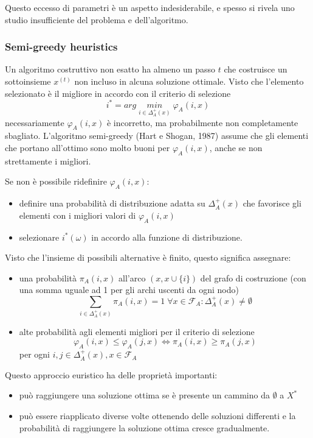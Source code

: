\documentclass{article}
\begin{document}
Questo eccesso di parametri è un aspetto indesiderabile, e spesso si rivela uno studio insufficiente del
problema e dell'algoritmo.

\subsubsection{Semi-greedy heuristics}
Un algoritmo costruttivo non esatto ha almeno un passo $t$ che costruisce un sottoinsieme
$x^{(t)}$ non incluso in alcuna soluzione ottimale. Visto che l'elemento selezionato è il migliore
in accordo con il criterio di selezione
$$i^*=arg\;\underset{i\in\Delta_A^+(x)}{min}\;\varphi_A(i,x)$$
necessariamente $\varphi_A(i,x)$ è incorretto, ma probabilmente non completamente sbagliato.
L'algoritmo semi-greedy (Hart e Shogan, 1987) assume che gli elementi che portano all'ottimo sono molto
buoni per $\varphi_A(i,x)$, anche se non strettamente i migliori.

Se non è possibile ridefinire $\varphi_A(i,x)$:
\begin{itemize}
    \item definire una probabilità di distribuzione adatta su $\Delta_A^+(x)$ che favorisce
    gli elementi con i migliori valori di $\varphi_A(i,x)$
    \item selezionare $i^*(\omega)$ in accordo alla funzione di distribuzione.
\end{itemize}
Visto che l'insieme di possibili alternative è finito, questo significa assegnare:
\begin{itemize}
    \item una probabilità $\pi_A(i,x)$ all'arco $(x,x\cup\{i\})$ del grafo di costruzione (con una
    somma uguale ad 1 per gli archi uscenti da ogni nodo)
    $$\sum_{i\in\Delta_A^+(x)}\pi_A(i,x)=1\;\forall x\in\mathcal{F}_A:\Delta_A^+(x)\neq\emptyset$$
    \item alte probabilità agli elementi migliori per il criterio di selezione
    $$\varphi_A(i,x)\leq\varphi_A(j,x)\Leftrightarrow\pi_A(i,x)\geq\pi_A(j,x)$$
    per ogni $i,j\in\Delta_A^+(x),x\in\mathcal{F}_A$
\end{itemize}

Questo approccio euristico ha delle proprietà importanti:
\begin{itemize}
    \item può raggiungere una soluzione ottima se è presente un cammino da $\emptyset$ a $X^*$
    \item può essere riapplicato diverse volte ottenendo delle soluzioni differenti e la probabilità
    di raggiungere la soluzione ottima cresce gradualmente.

\end{itemize}
\end{document}

